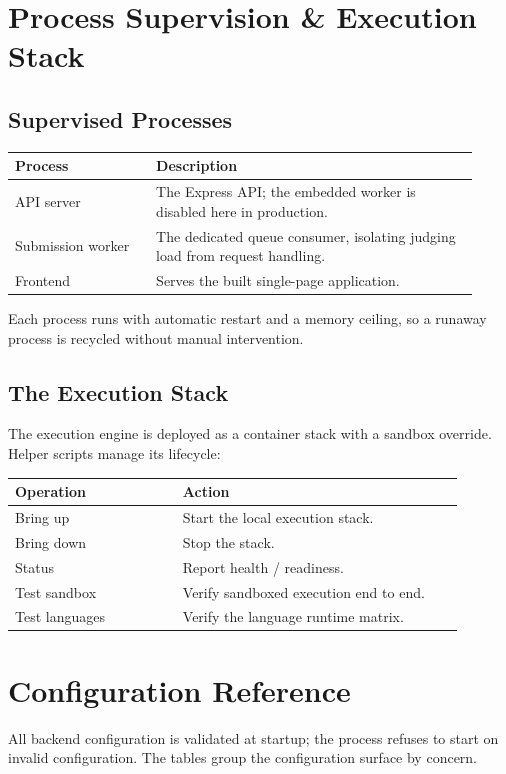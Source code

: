 \documentclass[12pt,a4paper,oneside]{report}
\begin{document}
\chapter{Process Supervision \& Execution Stack}
\section{Supervised Processes}
\begin{longtable}{@{}p{0.28\linewidth} p{0.64\linewidth}@{}}
\toprule
\textbf{Process} & \textbf{Description}\\
\midrule
\endhead
API server & The Express API; the embedded worker is disabled here in production.\\
Submission worker & The dedicated queue consumer, isolating judging load from request handling.\\
Frontend & Serves the built single-page application.\\
\bottomrule
\end{longtable}
Each process runs with automatic restart and a memory ceiling, so a runaway
process is recycled without manual intervention.

\section{The Execution Stack}
The execution engine is deployed as a container stack with a sandbox override.
Helper scripts manage its lifecycle:
\begin{longtable}{@{}p{0.34\linewidth} p{0.58\linewidth}@{}}
\toprule
\textbf{Operation} & \textbf{Action}\\
\midrule
\endhead
Bring up & Start the local execution stack.\\
Bring down & Stop the stack.\\
Status & Report health / readiness.\\
Test sandbox & Verify sandboxed execution end to end.\\
Test languages & Verify the language runtime matrix.\\
\bottomrule
\end{longtable}

\chapter{Configuration Reference}
All backend configuration is validated at startup; the process refuses to start
on invalid configuration. The tables group the configuration surface by concern.
\end{document}
